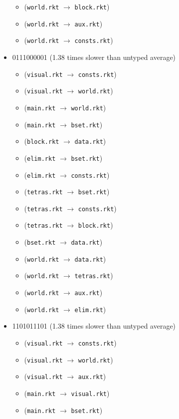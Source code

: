 \documentclass{article}
\newcommand{\mono}[1]{\texttt{#1}}
\begin{document}
\begin{itemize}
\begin{itemize}
  \item (\mono{world.rkt} $\rightarrow$ \mono{block.rkt})
  \item (\mono{world.rkt} $\rightarrow$ \mono{aux.rkt})
  \item (\mono{world.rkt} $\rightarrow$ \mono{consts.rkt})
  \end{itemize}
\item 0111000001 (1.38 times slower than untyped average)
  \begin{itemize}
  \item (\mono{visual.rkt} $\rightarrow$ \mono{consts.rkt})
  \item (\mono{visual.rkt} $\rightarrow$ \mono{world.rkt})
  \item (\mono{main.rkt} $\rightarrow$ \mono{world.rkt})
  \item (\mono{main.rkt} $\rightarrow$ \mono{bset.rkt})
  \item (\mono{block.rkt} $\rightarrow$ \mono{data.rkt})
  \item (\mono{elim.rkt} $\rightarrow$ \mono{bset.rkt})
  \item (\mono{elim.rkt} $\rightarrow$ \mono{consts.rkt})
  \item (\mono{tetras.rkt} $\rightarrow$ \mono{bset.rkt})
  \item (\mono{tetras.rkt} $\rightarrow$ \mono{consts.rkt})
  \item (\mono{tetras.rkt} $\rightarrow$ \mono{block.rkt})
  \item (\mono{bset.rkt} $\rightarrow$ \mono{data.rkt})
  \item (\mono{world.rkt} $\rightarrow$ \mono{data.rkt})
  \item (\mono{world.rkt} $\rightarrow$ \mono{tetras.rkt})
  \item (\mono{world.rkt} $\rightarrow$ \mono{aux.rkt})
  \item (\mono{world.rkt} $\rightarrow$ \mono{elim.rkt})
  \end{itemize}
\item 1101011101 (1.38 times slower than untyped average)
  \begin{itemize}
  \item (\mono{visual.rkt} $\rightarrow$ \mono{consts.rkt})
  \item (\mono{visual.rkt} $\rightarrow$ \mono{world.rkt})
  \item (\mono{visual.rkt} $\rightarrow$ \mono{aux.rkt})
  \item (\mono{main.rkt} $\rightarrow$ \mono{visual.rkt})
  \item (\mono{main.rkt} $\rightarrow$ \mono{bset.rkt})

\end{itemize}
\end{itemize}
\end{document}
